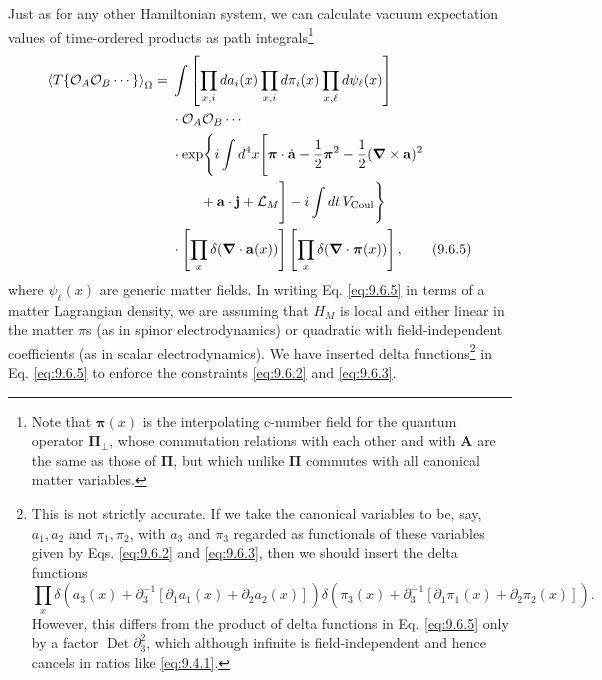 Just as for any other Hamiltonian system, we can calculate vacuum expectation
values of time-ordered products as path integrals\footnote{Note that
$\boldsymbol\pi(x)$ is the interpolating c-number field for the quantum
operator $\boldsymbol\Pi_\perp$, whose commutation relations with each other
and with $\mathbf A$ are the same as those of $\boldsymbol\Pi$, but which unlike
$\boldsymbol\Pi$ commutes with all canonical matter variables.}
\begin{align}
\left\langle T\{\mathcal O_A\mathcal O_B\cdots\}\right\rangle_{\Omega}
={}&\int\left[\prod_{x,i}da_i(x)\prod_{x,i}d\pi_i(x)
 \prod_{x,\ell}d\psi_\ell(x)\right]
\notag\\
&\cdot\mathcal O_A\mathcal O_B\cdots
\notag\\
&\cdot\exp\Biggl\{i\int d^4x\Biggl[
 \boldsymbol\pi\cdot\dot{\mathbf a}-\frac12\boldsymbol\pi^2
 -\frac12(\boldsymbol\nabla\times\mathbf a)^2
\notag\\
&\qquad+\mathbf a\cdot\mathbf j+\mathcal L_M\Biggr]
 -i\int dt\,V_{\mathrm{Coul}}\Biggr\}
\notag\\
&\cdot\left[\prod_x\delta(\boldsymbol\nabla\cdot\mathbf a(x))\right]
 \left[\prod_x\delta(\boldsymbol\nabla\cdot\boldsymbol\pi(x))\right],
\tag{9.6.5}\label{eq:9.6.5}
\end{align}
where $\psi_\ell(x)$ are generic matter fields. In writing Eq. \eqref{eq:9.6.5} in
terms of a matter Lagrangian density, we are assuming that $H_M$ is local and
either linear in the matter $\pi$s (as in spinor electrodynamics) or quadratic
with field-independent coefficients (as in scalar electrodynamics). We have
inserted delta functions\footnote{This is not strictly accurate. If we take
the canonical variables to be, say, $a_1,a_2$ and $\pi_1,\pi_2$, with $a_3$
and $\pi_3$ regarded as functionals of these variables given by Eqs. \eqref{eq:9.6.2}
and \eqref{eq:9.6.3}, then we should insert the delta functions
\[
\prod_x\delta\!\left(a_3(x)+\partial_3^{-1}
 [\partial_1a_1(x)+\partial_2a_2(x)]\right)
\delta\!\left(\pi_3(x)+\partial_3^{-1}
 [\partial_1\pi_1(x)+\partial_2\pi_2(x)]\right).
\]
However, this differs from the product of delta functions in Eq. \eqref{eq:9.6.5} only
by a factor $\operatorname{Det}\partial_3^2$, which although infinite is
field-independent and hence cancels in ratios like \eqref{eq:9.4.1}.} in Eq. \eqref{eq:9.6.5} to
enforce the constraints \eqref{eq:9.6.2} and \eqref{eq:9.6.3}.

